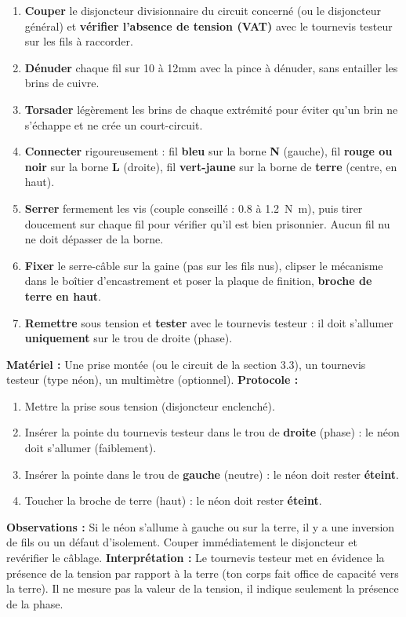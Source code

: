 \documentclass[11pt]{article}
\begin{document}
\begin{methode}
\begin{enumerate}
\item \textbf{Couper} le disjoncteur divisionnaire du circuit concerné (ou le disjoncteur général) et \textbf{vérifier l'absence de tension (VAT)} avec le tournevis testeur sur les fils à raccorder.
\item \textbf{Dénuder} chaque fil sur \num{10} à \num{12}{mm} avec la pince à dénuder, sans entailler les brins de cuivre.
\item \textbf{Torsader} légèrement les brins de chaque extrémité pour éviter qu'un brin ne s'échappe et ne crée un court-circuit.
\item \textbf{Connecter} rigoureusement : fil \textbf{bleu} sur la borne \textbf{N} (gauche), fil \textbf{rouge ou noir} sur la borne \textbf{L} (droite), fil \textbf{vert-jaune} sur la borne de \textbf{terre} (centre, en haut).
\item \textbf{Serrer} fermement les vis (couple conseillé : \num{0,8} à \SI{1,2}{N.m}), puis tirer doucement sur chaque fil pour vérifier qu'il est bien prisonnier. Aucun fil nu ne doit dépasser de la borne.
\item \textbf{Fixer} le serre-câble sur la gaine (pas sur les fils nus), clipser le mécanisme dans le boîtier d'encastrement et poser la plaque de finition, \textbf{broche de terre en haut}.
\item \textbf{Remettre} sous tension et \textbf{tester} avec le tournevis testeur : il doit s'allumer \textbf{uniquement} sur le trou de droite (phase).
\end{enumerate}
\end{methode}

\begin{experience}
\textbf{Matériel :} Une prise montée (ou le circuit de la section 3.3), un tournevis testeur (type néon), un multimètre (optionnel).
\textbf{Protocole :}
\begin{enumerate}
\item Mettre la prise sous tension (disjoncteur enclenché).
\item Insérer la pointe du tournevis testeur dans le trou de \textbf{droite} (phase) : le néon doit s'allumer (faiblement).
\item Insérer la pointe dans le trou de \textbf{gauche} (neutre) : le néon doit rester \textbf{éteint}.
\item Toucher la broche de terre (haut) : le néon doit rester \textbf{éteint}.
\end{enumerate}
\textbf{Observations :} Si le néon s'allume à gauche ou sur la terre, il y a une inversion de fils ou un défaut d'isolement. Couper immédiatement le disjoncteur et revérifier le câblage.
\textbf{Interprétation :} Le tournevis testeur met en évidence la présence de la tension par rapport à la terre (ton corps fait office de capacité vers la terre). Il ne mesure pas la valeur de la tension, il indique seulement la présence de la phase.
\end{experience}
\end{document}
